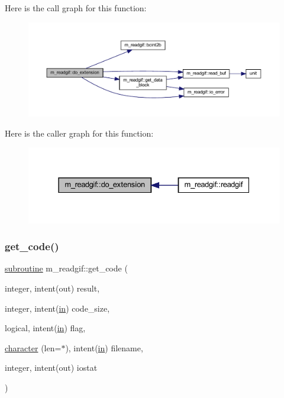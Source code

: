 Here is the call graph for this function\+:
\nopagebreak
\begin{figure}[H]
\begin{center}
\leavevmode
\includegraphics[width=350pt]{namespacem__readgif_a93c5f69ee5054ba2c10ed17b8ab53f6b_cgraph}
\end{center}
\end{figure}
Here is the caller graph for this function\+:
\nopagebreak
\begin{figure}[H]
\begin{center}
\leavevmode
\includegraphics[width=331pt]{namespacem__readgif_a93c5f69ee5054ba2c10ed17b8ab53f6b_icgraph}
\end{center}
\end{figure}
\mbox{\label{namespacem__readgif_a027fedbf7ba68763483988c1aa6d2cea}} 
\subsubsection{\texorpdfstring{get\+\_\+code()}{get\_code()}}
{\footnotesize\ttfamily \hyperlink{M__stopwatch_83_8txt_acfbcff50169d691ff02d4a123ed70482}{subroutine} m\+\_\+readgif\+::get\+\_\+code (\begin{DoxyParamCaption}\item[{integer, intent(out)}]{result,  }\item[{integer, intent(\hyperlink{M__journal_83_8txt_afce72651d1eed785a2132bee863b2f38}{in})}]{code\+\_\+size,  }\item[{logical, intent(\hyperlink{M__journal_83_8txt_afce72651d1eed785a2132bee863b2f38}{in})}]{flag,  }\item[{\hyperlink{option__stopwatch_83_8txt_abd4b21fbbd175834027b5224bfe97e66}{character} (len=$\ast$), intent(\hyperlink{M__journal_83_8txt_afce72651d1eed785a2132bee863b2f38}{in})}]{filename,  }\item[{integer, intent(out)}]{iostat }\end{DoxyParamCaption})\hspace{0.3cm}{\ttfamily [private]}}



